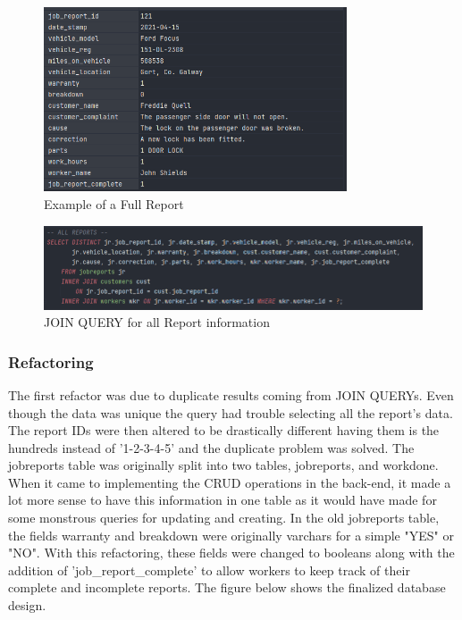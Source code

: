 \begin{figure}[H]
    \caption{Example of a Full Report}
    \label{image:dbReport}
    \centering
    \includegraphics[width=0.8\textwidth]{images/database/job_report.png}
\end{figure}

\begin{figure}[H]
    \caption{JOIN QUERY  for all Report information}
    \label{image:join}
    \centering
    \includegraphics[width=1.0\textwidth]{images/database/raw_mysql_join.png}
\end{figure}

\subsubsection{Refactoring}
The first refactor was due to duplicate results coming from JOIN QUERYs. Even though the data was unique the query had trouble selecting all the report's data. The report IDs were then altered to be drastically different having them is the hundreds instead of '1-2-3-4-5' and the duplicate problem was solved. The jobreports table was originally split into two tables, jobreports, and workdone. When it came to implementing the CRUD operations in the back-end, it made a lot more sense to have this information in one table as it would have made for some monstrous queries for updating and creating. In the old jobreports table, the fields warranty and breakdown were originally varchars for a simple "YES" or "NO". With this refactoring, these fields were changed to booleans along with the addition of 'job\_report\_complete' to allow workers to keep track of their complete and incomplete reports. The figure below shows the finalized database design.

